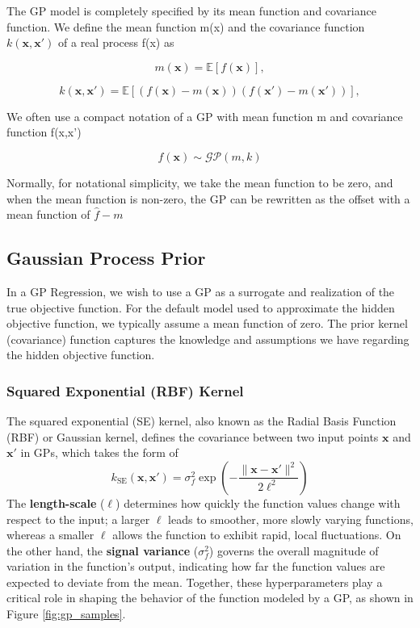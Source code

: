 \documentclass{ut-thesis}
\begin{document}
The GP model is completely specified by its mean function and covariance function. We define the mean function m(x) and the covariance function $k(\mathbf{x},\mathbf{x'})$ of a real process f(x) as

\begin{equation}
    m(\mathbf{x}) = \mathbb{E}[f(\mathbf{x})],
\end{equation}

\begin{equation}
    k(\mathbf{x}, \mathbf{x}') = \mathbb{E}[(f(\mathbf{x}) - m(\mathbf{x}))(f(\mathbf{x}') - m(\mathbf{x}'))],
\end{equation}

We often use a compact notation of a GP with mean function m and covariance function f(x,x') 

\begin{equation}
    f(\mathbf{x}) \sim \mathcal{GP} (m,k)
\end{equation}

Normally, for notational simplicity, we take the mean function to be zero, and when the mean function is non-zero, the GP can be rewritten as the offset with a mean function of $\hat{f} - m$

\subsection{Gaussian Process Prior}
In a GP Regression, we wish to use a GP as a surrogate and realization of the true objective function. For the default model used to approximate the hidden objective function, we typically assume a mean function of zero. The prior kernel (covariance) function captures the knowledge and assumptions we have regarding the hidden objective function. 

\subsubsection{Squared Exponential (RBF) Kernel}

The squared exponential (SE) kernel, also known as the Radial Basis Function (RBF) or Gaussian kernel, defines the covariance between two input points $\mathbf{x}$ and $\mathbf{x'}$  in GPs\cite{rasmussen2006gaussian}, which takes the form of
\begin{equation}
    k_{\text{SE}}(\mathbf{x}, \mathbf{x'}) = \sigma_f^2 \exp\left( -\frac{\|\mathbf{x} - \mathbf{x'}\|^2}{2\ell^2} \right)
\end{equation}
The \textbf{length-scale} (\(\ell\)) determines how quickly the function values change with respect to the input; a larger \(\ell\) leads to smoother, more slowly varying functions, whereas a smaller \(\ell\) allows the function to exhibit rapid, local fluctuations. On the other hand, the \textbf{signal variance} (\(\sigma_f^2\)) governs the overall magnitude of variation in the function's output, indicating how far the function values are expected to deviate from the mean. Together, these hyperparameters play a critical role in shaping the behavior of the function modeled by a GP, as shown in Figure \ref{fig:gp_samples}.
\end{document}
